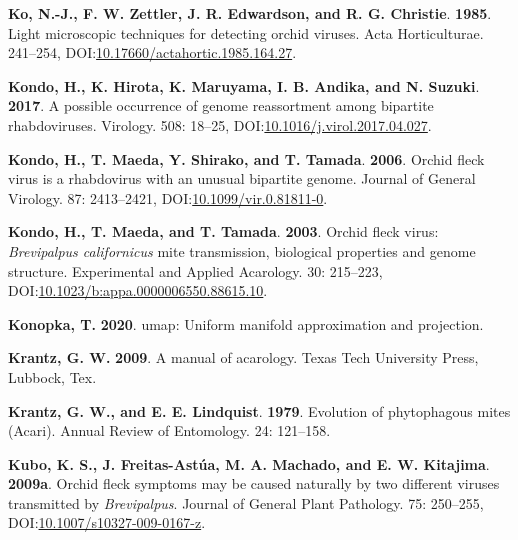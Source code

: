 \documentclass[12pt,final,CPage]{ufthesis}
\newlength{\cslhangindent}
\newenvironment{CSLReferences}[2] %
{%
	\setlength{\parindent}{0pt}
	\ifodd #1 \everypar{\setlength{\hangindent}{\cslhangindent}}\ignorespaces\fi
	\ifnum #2 > 0
	\setlength{\parskip}{#2\baselineskip}
	\fi
}%
{}
\begin{document}
{\begin{CSLReferences}{1}{0}
  \leavevmode{}%
  \textbf{Ko, N.-J., F. W. Zettler, J. R. Edwardson, and R. G. Christie}. \textbf{1985}. Light microscopic techniques for detecting orchid viruses. Acta Horticulturae. 241--254, DOI:\href{https://doi.org/10.17660/actahortic.1985.164.27}{10.17660/actahortic.1985.164.27}.

  \leavevmode{}%
  \textbf{Kondo, H., K. Hirota, K. Maruyama, I. B. Andika, and N. Suzuki}. \textbf{2017}. A possible occurrence of genome reassortment among bipartite rhabdoviruses. Virology. 508: 18--25, DOI:\href{https://doi.org/10.1016/j.virol.2017.04.027}{10.1016/j.virol.2017.04.027}.

  \leavevmode{}%
  \textbf{Kondo, H., T. Maeda, Y. Shirako, and T. Tamada}. \textbf{2006}. {Orchid fleck virus} is a rhabdovirus with an unusual bipartite genome. Journal of General Virology. 87: 2413--2421, DOI:\href{https://doi.org/10.1099/vir.0.81811-0}{10.1099/vir.0.81811-0}.

  \leavevmode{}%
  \textbf{Kondo, H., T. Maeda, and T. Tamada}. \textbf{2003}. {Orchid fleck virus}: {\emph{Brevipalpus californicus}} mite transmission, biological properties and genome structure. Experimental and Applied Acarology. 30: 215--223, DOI:\href{https://doi.org/10.1023/b:appa.0000006550.88615.10}{10.1023/b:appa.0000006550.88615.10}.

  \leavevmode{}%
  \textbf{Konopka, T.} \textbf{2020}. {umap}: Uniform manifold approximation and projection.

  \leavevmode{}%
  \textbf{Krantz, G. W.} \textbf{2009}. A manual of acarology. Texas Tech University Press, Lubbock, Tex.

  \leavevmode{}%
  \textbf{Krantz, G. W., and E. E. Lindquist}. \textbf{1979}. Evolution of phytophagous mites ({Acari}). Annual Review of Entomology. 24: 121--158.

  \leavevmode{}%
  \textbf{Kubo, K. S., J. Freitas-Astúa, M. A. Machado, and E. W. Kitajima}. \textbf{2009a}. {Orchid fleck} symptoms may be caused naturally by two different viruses transmitted by {\emph{Brevipalpus}}. Journal of General Plant Pathology. 75: 250--255, DOI:\href{https://doi.org/10.1007/s10327-009-0167-z}{10.1007/s10327-009-0167-z}.


\end{CSLReferences}}
\end{document}
